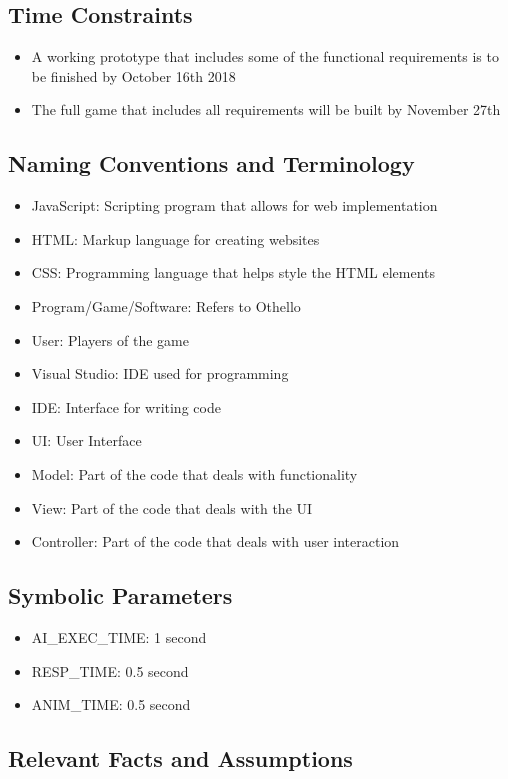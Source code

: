 \documentclass[12pt, titlepage]{article}
\begin{document}
\subsection{Time Constraints}
\begin{itemize}
	\item A working prototype that includes some of the functional requirements is to be finished by October 16th 2018
	\item The full game that includes all requirements will be built by November 27th
\end{itemize}


\subsection{Naming Conventions and Terminology}
\begin{itemize}
	\item JavaScript: Scripting program that allows for web implementation
	\item HTML: Markup language for creating websites
	\item CSS: Programming language that helps style the HTML elements
	\item Program/Game/Software: Refers to Othello
	\item User: Players of the game
	\item Visual Studio: IDE used for programming
	\item IDE: Interface for writing code
	\item UI: User Interface
	\item Model: Part of the code that deals with functionality
	\item View: Part of the code that deals with the UI
	\item Controller: Part of the code that deals with user interaction
\end{itemize}

\subsection{Symbolic Parameters}
\begin{itemize}
	\item {\color {blue} AI\_EXEC\_TIME: 1 second}
	\item {\color {blue} RESP\_TIME: 0.5 second }
	\item {\color {blue} ANIM\_TIME:   0.5 second}
\end{itemize}

\subsection{Relevant Facts and Assumptions}
\end{document}
